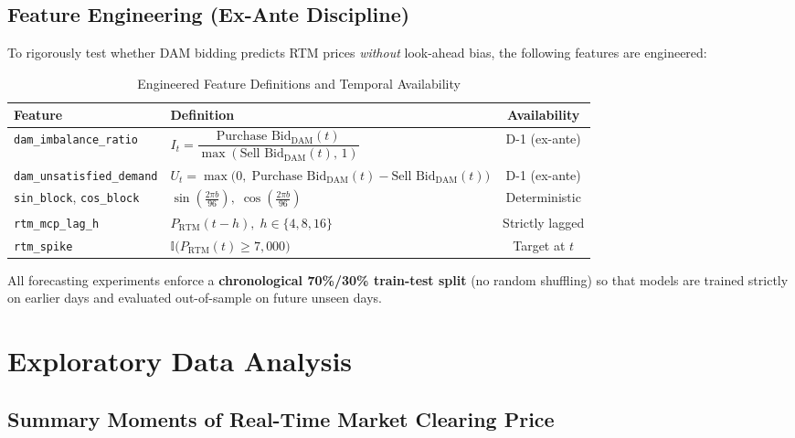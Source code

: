 \documentclass[12pt, a4paper]{article}
\theoremstyle{definition}
\newcommand{\dam}{\text{DAM}}
\newcommand{\rtm}{\text{RTM}}
\begin{document}
\subsection{Feature Engineering (Ex-Ante Discipline)}

To rigorously test whether DAM bidding predicts RTM prices \emph{without} look-ahead bias, the following features are engineered:

\begin{table}[H]
\centering
\caption{Engineered Feature Definitions and Temporal Availability}
\label{tab:features}
\small
\begin{tabularx}{\textwidth}{l X c}
\toprule
\textbf{Feature} & \textbf{Definition} & \textbf{Availability} \\
\midrule
\texttt{dam\_imbalance\_ratio} & $I_t = \dfrac{\text{Purchase Bid}_{\dam}(t)}{\max(\text{Sell Bid}_{\dam}(t),\, 1)}$ & D-1 (ex-ante) \\[8pt]
\texttt{dam\_unsatisfied\_demand} & $U_t = \max\!\big(0,\; \text{Purchase Bid}_{\dam}(t) - \text{Sell Bid}_{\dam}(t)\big)$ & D-1 (ex-ante) \\[8pt]
\texttt{sin\_block}, \texttt{cos\_block} & $\sin\!\left(\frac{2\pi b}{96}\right),\; \cos\!\left(\frac{2\pi b}{96}\right)$ & Deterministic \\[8pt]
\texttt{rtm\_mcp\_lag\_h} & $P_{\rtm}(t - h),\; h \in \{4, 8, 16\}$ & Strictly lagged \\[4pt]
\texttt{rtm\_spike} & $\mathbb{I}\!\big(P_{\rtm}(t) \geq 7{,}000\big)$ & Target at $t$ \\
\bottomrule
\end{tabularx}
\end{table}

All forecasting experiments enforce a \textbf{chronological 70\%/30\% train-test split} (no random shuffling) so that models are trained strictly on earlier days and evaluated out-of-sample on future unseen days.

\section{Exploratory Data Analysis}

\subsection{Summary Moments of Real-Time Market Clearing Price}
\end{document}
